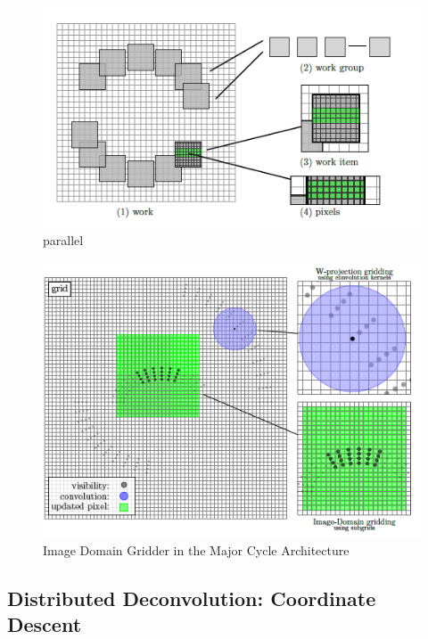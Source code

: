 \begin{figure}[h]
	\centering
	\includegraphics[width=0.40\linewidth]{./chapters/03.distribution/idg/paralellization.png}
	\caption{parallel}
	\label{distribution:idg:parallel}
\end{figure}

\begin{figure}[h]
	\centering
	\includegraphics[width=0.40\linewidth]{./chapters/03.distribution/idg/idg0.png}
	\caption{Image Domain Gridder in the Major Cycle Architecture}
	\label{distribution:idg:idg0}
\end{figure}





\subsection{Distributed Deconvolution: Coordinate Descent}


